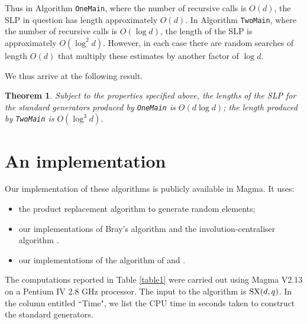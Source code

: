 \documentclass[12pt]{article}
\newtheorem{theorem}[definition]{Theorem}
\def\SX{{\rm SX}}
\begin{document}
Thus in Algorithm {\tt OneMain}, where the number of recursive calls 
is $O(d)$, the SLP in question has length approximately $O(d)$.   
In Algorithm {\tt TwoMain}, 
where the number of recursive calls 
is $O(\log d)$, the length of the SLP is approximately $O(\log^2 d)$.  
However, in each case there
are random searches of length $O(d)$ that multiply these estimates 
by another factor of $\log d$.


We thus arrive at the following result.
\begin{theorem} 
Subject to the properties specified above, the lengths of 
the SLP for the standard generators produced by 
{\tt OneMain} is $O(d\log d)$; the length produced by {\tt TwoMain}
is $O(\log^3 d)$.
\end{theorem}

\section{An implementation}
Our implementation of these algorithms is publicly available in {\sc Magma}.
It uses:
\begin{itemize}
\item 
the product replacement algorithm \cite{Celleretal95}
to generate random elements; 
\item our implementations of Bray's algorithm \cite{Bray}
and the involution-centraliser algorithm \cite{Ryba-paper}.
\item our implementations of the algorithm of \cite{Conderetal05}
and \cite{sl3q}.
\end{itemize}

The computations reported in Table \ref{table1} were carried out
using {\sc Magma} V2.13 on a Pentium IV 2.8 GHz processor.
The input to the algorithm is $\SX (d, q)$.
In the column entitled ``Time", we list the CPU time in seconds
taken to construct the standard generators.
\end{document}
